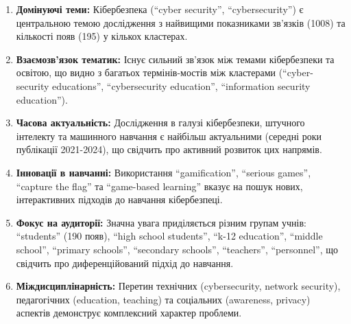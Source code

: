 \documentclass[12pt,a4paper,landscape]{article}
\begin{document}
\begin{enumerate}
    \item \textbf{Домінуючі теми:} Кібербезпека (``cyber security'', ``cybersecurity'') є центральною темою дослідження з найвищими показниками зв'язків (1008) та кількості появ (195) у кількох кластерах.
    
    \item \textbf{Взаємозв'язок тематик:} Існує сильний зв'язок між темами кібербезпеки та освітою, що видно з багатьох термінів-мостів між кластерами (``cyber-security educations'', ``cybersecurity education'', ``information security education'').
    
    \item \textbf{Часова актуальність:} Дослідження в галузі кібербезпеки, штучного інтелекту та машинного навчання є найбільш актуальними (середні роки публікації 2021-2024), що свідчить про активний розвиток цих напрямів.
    
    \item \textbf{Інновації в навчанні:} Використання ``gamification'', ``serious games'', ``capture the flag'' та ``game-based learning'' вказує на пошук нових, інтерактивних підходів до навчання кібербезпеці.
    
    \item \textbf{Фокус на аудиторії:} Значна увага приділяється різним групам учнів: ``students'' (190 появ), ``high school students'', ``k-12 education'', ``middle school'', ``primary schools'', ``secondary schools'', ``teachers'', ``personnel'', що свідчить про диференційований підхід до навчання.
    
    \item \textbf{Міждисциплінарність:} Перетин технічних (cybersecurity, network security), педагогічних (education, teaching) та соціальних (awareness, privacy) аспектів демонструє комплексний характер проблеми.
\end{enumerate}
\end{document}
